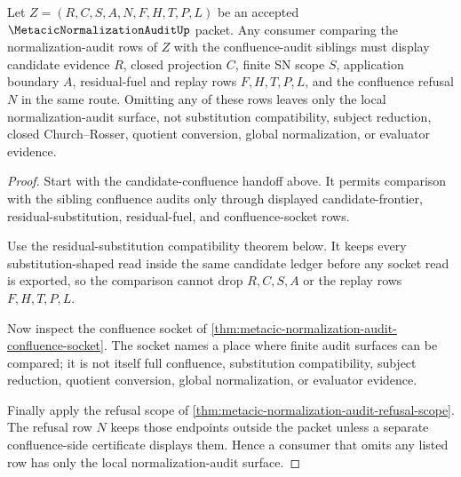 \begin{theorem}
\label{thm:metacic-normalization-audit-candidate-confluence-boundary}
Let $Z=(R,C,S,A,N,F,H,T,P,L)$ be an accepted
$\MetacicNormalizationAuditUp$ packet. Any consumer comparing the
normalization-audit rows of $Z$ with the confluence-audit siblings must display
candidate evidence $R$, closed projection $C$, finite SN scope $S$, application
boundary $A$, residual-fuel and replay rows $F,H,T,P,L$, and the confluence
refusal $N$ in the same route. Omitting any of these rows leaves only the local
normalization-audit surface, not substitution compatibility, subject reduction,
closed Church--Rosser, quotient conversion, global normalization, or evaluator
evidence.
\end{theorem}
\begin{proof}
Start with the candidate-confluence handoff above. It permits comparison with
the sibling confluence audits only through displayed candidate-frontier,
residual-substitution, residual-fuel, and confluence-socket rows.

Use the residual-substitution compatibility theorem below. It keeps every
substitution-shaped read inside the same candidate ledger before any socket
read is exported, so the comparison cannot drop $R,C,S,A$ or the replay rows
$F,H,T,P,L$.

Now inspect the confluence socket of
\autoref{thm:metacic-normalization-audit-confluence-socket}. The socket names a
place where finite audit surfaces can be compared; it is not itself full
confluence, substitution compatibility, subject reduction, quotient conversion,
global normalization, or evaluator evidence.

Finally apply the refusal scope of
\autoref{thm:metacic-normalization-audit-refusal-scope}. The refusal row $N$
keeps those endpoints outside the packet unless a separate confluence-side
certificate displays them. Hence a consumer that omits any listed row has only
the local normalization-audit surface.
\end{proof}

